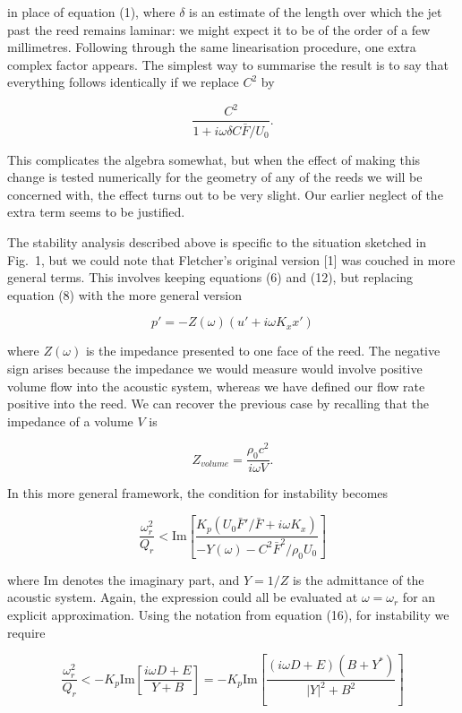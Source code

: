   in place of equation (1), where $\delta$ is an estimate of the length over 
  which the jet past the reed remains laminar: we might expect it to be of the 
  order of a few millimetres. Following through the same linearisation 
  procedure, one extra complex factor appears. The simplest way to summarise 
  the result is to say that everything follows identically if we replace $C^2$ 
  by 

  $$\dfrac{C^2}{1+i \omega \delta C \bar{F}/U_0}. \tag{19}$$ 

  This complicates the algebra somewhat, but when the effect of making this 
  change is tested numerically for the geometry of any of the reeds we will be 
  concerned with, the effect turns out to be very slight. Our earlier neglect 
  of the extra term seems to be justified. 

  The stability analysis described above is specific to the situation sketched 
  in Fig.\ 1, but we could note that Fletcher's original version [1] was 
  couched in more general terms. This involves keeping equations (6) and (12), 
  but replacing equation (8) with the more general version 

  $$p'=-Z(\omega) \left(u'+i \omega K_x x' \right) \tag{20}$$ 

  where $Z(\omega)$ is the impedance presented to one face of the reed. The 
  negative sign arises because the impedance we would measure would involve 
  positive volume flow into the acoustic system, whereas we have defined our 
  flow rate positive into the reed. We can recover the previous case by 
  recalling that the impedance of a volume $V$ is 

  $$Z_{volume}=\dfrac{\rho_0 c^2}{i \omega V}. \tag{21}$$ 

  In this more general framework, the condition for instability becomes 

  $$\dfrac{\omega_r^2}{Q_r} < \mathrm{Im}\left[\dfrac{K_p(U_0 \bar{F}'/\bar{F} 
  + i \omega K_x)}{-Y(\omega)-C^2 \bar{F}^2/\rho_0 U_0}\right] \tag{22}$$ 

  where $\mathrm{Im}$ denotes the imaginary part, and $Y=1/Z$ is the admittance 
  of the acoustic system. Again, the expression could all be evaluated at 
  $\omega=\omega_r$ for an explicit approximation. Using the notation from 
  equation (16), for instability we require 

  $$\dfrac{\omega_r^2}{Q_r} <-K_p \mathrm{Im} \left[ \dfrac{i \omega D + E}{Y 
  +B}\right]=-K_p\mathrm{Im} \left[\dfrac{(i \omega D + 
  E)(B+Y^*)}{|Y|^2+B^2}\right]$$ 

